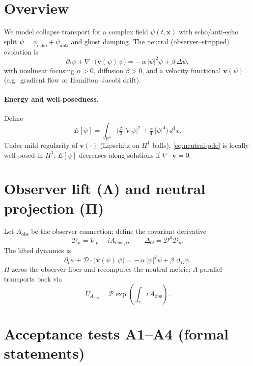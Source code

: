 \providecommand{\D}{\mathcal{D}}

\section*{Overview}
We model collapse transport for a complex field $\psi(t,\mathbf{x})$ with echo/anti-echo split
$\psi=\psi_{\mathrm{echo}}+\psi_{\mathrm{anti}}$ and ghost damping. The neutral (observer–stripped) evolution is
\begin{equation}
\partial_t \psi + \nabla\!\cdot\!\big(\mathbf{v}(\psi)\,\psi\big)
= -\,\alpha\,|\psi|^2 \psi + \beta\,\Delta\psi,
\label{eq:neutral-pde}
\end{equation}
with nonlinear focusing $\alpha>0$, diffusion $\beta>0$, and a velocity functional $\mathbf{v}(\psi)$ (e.g.\ gradient flow or Hamilton–Jacobi drift).

\paragraph{Energy and well-posedness.}
Define
\begin{equation}
E[\psi]=\int_{\mathbb{R}^3}\!\Big(\tfrac{\beta}{2}\,|\nabla\psi|^2+\tfrac{\alpha}{4}\,|\psi|^4\Big)\,d^3x.
\end{equation}
Under mild regularity of $\mathbf{v}(\cdot)$ (Lipschitz on $H^1$ balls), \eqref{eq:neutral-pde} is locally well-posed in $H^1$; $E[\psi]$ decreases along solutions if $\nabla\!\cdot\mathbf{v}=0$.

\section*{Observer lift ($\boldsymbol{\Lambda}$) and neutral projection ($\boldsymbol{\Pi}$)}
Let $A_{\mathrm{obs}}$ be the observer connection; define the covariant derivative
\[
\D_\mu=\nabla_\mu - i A_{\mathrm{obs},\mu},\qquad
\Delta_O=\D^\mu\D_\mu .
\]
The lifted dynamics is
\begin{equation}
\partial_t\psi + \D\!\cdot\!\big(\mathbf{v}(\psi)\,\psi\big)
= -\,\alpha\,|\psi|^2 \psi + \beta\,\Delta_O\psi.
\label{eq:lifted-transport}
\end{equation}
$\Pi$ zeros the observer fiber and recomputes the neutral metric; $\Lambda$ parallel-transports back via
\[
U_{A_{\mathrm{obs}}}=\mathcal{P}\exp\!\left(\int_\gamma i\,A_{\mathrm{obs}}\right).
\]

\section*{Acceptance tests A1–A4 (formal statements)}
\newtheorem{prop}{Proposition}[chapter]


